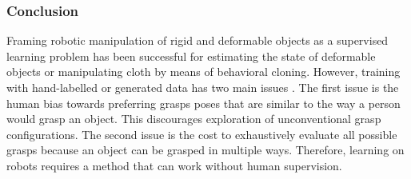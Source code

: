 \documentclass[\home/main.tex]{subfiles}
\begin{document}
\subsubsection{Conclusion}
Framing robotic manipulation of rigid and deformable objects as a supervised learning problem has been successful for estimating the state of deformable objects or manipulating cloth by means of behavioral cloning. However, training with hand-labelled or generated data has two main issues \autocite{pinto2016supersizing}. The first issue is the human bias towards preferring grasps poses that are similar to the way a person would grasp an object. This discourages exploration of unconventional grasp configurations. The second issue is the cost to exhaustively evaluate all possible grasps because an object can be grasped in multiple ways. Therefore, learning on robots requires a method that can work without human supervision.
\end{document}
